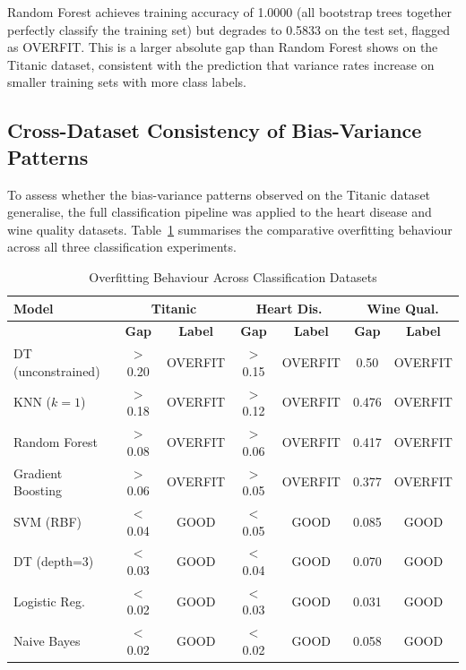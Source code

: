 \documentclass[conference]{IEEEtran}
\begin{document}
Random Forest achieves training accuracy of 1.0000 (all bootstrap trees together perfectly classify the training set) but degrades to 0.5833 on the test set, flagged as OVERFIT. This is a larger absolute gap than Random Forest shows on the Titanic dataset, consistent with the prediction that variance rates increase on smaller training sets with more class labels.

\subsection{Cross-Dataset Consistency of Bias-Variance Patterns}

To assess whether the bias-variance patterns observed on the Titanic dataset generalise, the full classification pipeline was applied to the heart disease and wine quality datasets. Table~\ref{tab:crossdataset} summarises the comparative overfitting behaviour across all three classification experiments.

\begin{table}[t]
    \caption{Overfitting Behaviour Across Classification Datasets}
    \label{tab:crossdataset}
    \centering
    \small
    \renewcommand{\arraystretch}{1.3}
    \begin{tabular}{|>{\raggedright\arraybackslash}p{0.85in}|c|c|c|c|c|c|}
    \hline
    \textbf{Model} & \multicolumn{2}{c|}{\textbf{Titanic}} & \multicolumn{2}{c|}{\textbf{Heart Dis.}} & \multicolumn{2}{c|}{\textbf{Wine Qual.}} \\
    \cline{2-7}
     & \textbf{Gap} & \textbf{Label} & \textbf{Gap} & \textbf{Label} & \textbf{Gap} & \textbf{Label} \\
    \hline
    DT (unconstrained) & $>$0.20 & OVERFIT & $>$0.15 & OVERFIT & 0.50 & OVERFIT \\
    \hline
    KNN ($k=1$)        & $>$0.18 & OVERFIT & $>$0.12 & OVERFIT & 0.476 & OVERFIT \\
    \hline
    Random Forest      & $>$0.08 & OVERFIT & $>$0.06 & OVERFIT & 0.417 & OVERFIT \\
    \hline
    Gradient Boosting  & $>$0.06 & OVERFIT & $>$0.05 & OVERFIT & 0.377 & OVERFIT \\
    \hline
    SVM (RBF)          & $<$0.04 & GOOD    & $<$0.05 & GOOD    & 0.085 & GOOD    \\
    \hline
    DT (depth=3)       & $<$0.03 & GOOD    & $<$0.04 & GOOD    & 0.070 & GOOD    \\
    \hline
    Logistic Reg.      & $<$0.02 & GOOD    & $<$0.03 & GOOD    & 0.031 & GOOD    \\
    \hline
    Naive Bayes        & $<$0.02 & GOOD    & $<$0.02 & GOOD    & 0.058 & GOOD    \\
    \hline
    \end{tabular}
\end{table}
\end{document}
